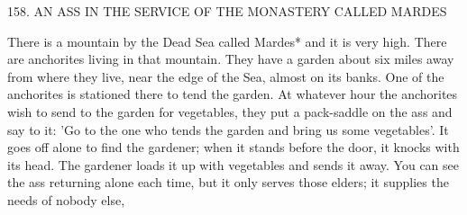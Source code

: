 158. AN ASS IN THE SERVICE OF THE MONASTERY
CALLED MARDES

There is a mountain by the Dead Sea called Mardes* and it is very
high. There are anchorites living in that mountain. They have a
garden about six miles away from where they live, near the edge of
the Sea, almost on its banks. One of the anchorites is stationed there
to tend the garden. At whatever hour the anchorites wish to send to
the garden for vegetables, they put a pack-saddle on the ass and say
to it: 'Go to the one who tends the garden and bring us some
vegetables'. It goes off alone to find the gardener; when it stands
before the door, it knocks with its head. The gardener loads it up
with vegetables and sends it away. You can see the ass returning
alone each time, but it only serves those elders; it supplies the needs
of nobody else,


